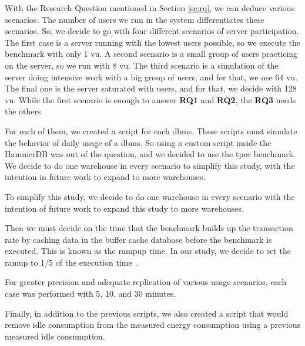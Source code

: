 With the Research Question mentioned in Section \ref{sc:rq}, we can deduce various scenarios. The number of users we run in the system differentiates these scenarios. So, we decide to go with four different scenarios of server participation. The first case is a server running with the lowest users possible, so we execute the benchmark with only 1 \gls{vu}. A second scenario is a small group of users practicing on the server, so we run with 8 \gls{vu}. The third scenario is a simulation of the server doing intensive work with a big group of users, and for that, we use 64 \gls{vu}. The final one is the server saturated with users, and for that, we decide with 128 \gls{vu}. 
While the first scenario is enough to answer \textbf{RQ1} and \textbf{RQ2}, the \textbf{RQ3} needs the others.
 

 
 For each of them, we created a script for each \gls{dbms}.  These scripts must simulate the behavior of daily usage of a \gls{dbms}. So using a custom script inside the HammerDB was out of the question, and we decided to use the \gls{tpcc} benchmark. We decide to do one warehouse in every scenario to simplify this study, with the intention in future work to expand to more warehouses. 
 

To simplify this study, we decide to do one warehouse in every scenario with the intention of future work to expand this study to more warehouses. 




Then we must decide on the time that the benchmark builds up the transaction rate by caching data in the buffer cache database before the benchmark is executed. This is known as the rampup time. In our study, we decide to set the ramup to 1/5 of the execution time~\cite{hammerdb}.

For greater precision and adequate replication of various usage scenarios, each case was performed with 5, 10, and 30 minutes.



Finally, in addition to the previous scripts, we also created a script that would remove idle consumption from the measured energy consumption using a previous measured idle consumption.



